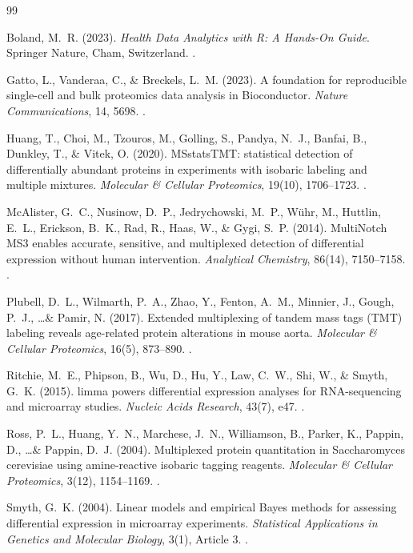 \documentclass[11pt,oneside]{book}
\begin{document}
\begin{thebibliography}{99}

Boland, M.~R. (2023). \textit{Health Data Analytics with R: A Hands-On Guide}. Springer Nature, Cham, Switzerland. .

Gatto, L., Vanderaa, C., \& Breckels, L.~M. (2023). A foundation for reproducible single-cell and bulk proteomics data analysis in Bioconductor. \textit{Nature Communications}, 14, 5698. .

Huang, T., Choi, M., Tzouros, M., Golling, S., Pandya, N.~J., Banfai, B., Dunkley, T., \& Vitek, O. (2020). MSstatsTMT: statistical detection of differentially abundant proteins in experiments with isobaric labeling and multiple mixtures. \textit{Molecular \& Cellular Proteomics}, 19(10), 1706--1723. .

McAlister, G.~C., Nusinow, D.~P., Jedrychowski, M.~P., W{\"u}hr, M., Huttlin, E.~L., Erickson, B.~K., Rad, R., Haas, W., \& Gygi, S.~P. (2014). MultiNotch MS3 enables accurate, sensitive, and multiplexed detection of differential expression without human intervention. \textit{Analytical Chemistry}, 86(14), 7150--7158. .

Plubell, D.~L., Wilmarth, P.~A., Zhao, Y., Fenton, A.~M., Minnier, J., Gough, P.~J., \dots \& Pamir, N. (2017). Extended multiplexing of tandem mass tags (TMT) labeling reveals age-related protein alterations in mouse aorta. \textit{Molecular \& Cellular Proteomics}, 16(5), 873--890. .

Ritchie, M.~E., Phipson, B., Wu, D., Hu, Y., Law, C.~W., Shi, W., \& Smyth, G.~K. (2015). limma powers differential expression analyses for RNA-sequencing and microarray studies. \textit{Nucleic Acids Research}, 43(7), e47. .

Ross, P.~L., Huang, Y.~N., Marchese, J.~N., Williamson, B., Parker, K., Pappin, D., \dots \& Pappin, D.~J. (2004). Multiplexed protein quantitation in Saccharomyces cerevisiae using amine-reactive isobaric tagging reagents. \textit{Molecular \& Cellular Proteomics}, 3(12), 1154--1169. .

Smyth, G.~K. (2004). Linear models and empirical Bayes methods for assessing differential expression in microarray experiments. \textit{Statistical Applications in Genetics and Molecular Biology}, 3(1), Article 3. .


\end{thebibliography}
\end{document}
